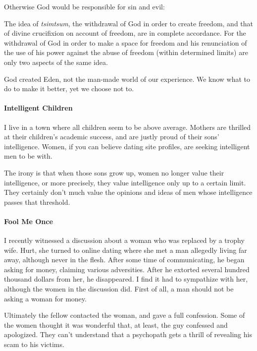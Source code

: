 Otherwise God would be responsible for sin and evil:

\begin{quotex}
The idea of \emph{tsimtsum}, the withdrawal of God in order to create freedom, and that of divine crucifixion on account of freedom, are in complete accordance. For the withdrawal of God in order to make a space for freedom and his renunciation of the use of his power against the abuse of freedom (within determined limits) are only two aspects of the same idea.
\end{quotex}


God created Eden, not the man-made world of our experience. We know what to do to make it better, yet we choose not to.

\paragraph{Intelligent Children}


I live in a town where all children seem to be above average. Mothers are thrilled at their children's academic success, and are justly proud of their sons' intelligence. Women, if you can believe dating site profiles, are seeking intelligent men to be with.

The irony is that when those sons grow up, women no longer value their intelligence, or more precisely, they value intelligence only up to a certain limit. They certainly don't much value the opinions and ideas of men whose intelligence passes that threshold.

\paragraph{Fool Me Once}


I recently witnessed a discussion about a woman who was replaced by a trophy wife. Hurt, she turned to online dating where she met a man allegedly living far away, although never in the flesh. After some time of communicating, he began asking for money, claiming various adversities. After he extorted several hundred thousand dollars from her, he disappeared. I find it had to sympathize with her, although the women in the discussion did. First of all, a man should not be asking a woman for money.

Ultimately the fellow contacted the woman, and gave a full confession. Some of the women thought it was wonderful that, at least, the guy confessed and apologized. They can't understand that a psychopath gets a thrill of revealing his scam to his victims.

